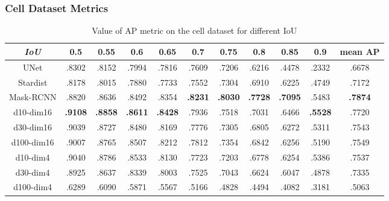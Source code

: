 \documentclass{beamer}
\begin{document}
\begin{frame}
    \frametitle{Cell Dataset Metrics}

    \begin{table}
        \scalebox{0.7}
        {
            \begin{tabular}[pos]{*{11}{c}}
                \hline
                \textit{IoU} & 0.5            & 0.55           & 0.6            & 0.65           & 0.7            & 0.75           & 0.8            & 0.85           & 0.9            & mean AP        \\
                \hline
                UNet         & .8302          & .8152          & .7994          & .7816          & .7609          & .7206          & .6216          & .4478          & .2332          & .6678          \\
                Stardist     & .8178          & .8015          & .7880          & .7733          & .7552          & .7304          & .6910          & .6225          & .4749          & .7172          \\
                Mask-RCNN    & .8820          & .8636          & .8492          & .8354          & \textbf{.8231} & \textbf{.8030} & \textbf{.7728} & \textbf{.7095} & .5483          & \textbf{.7874} \\
                \hline
                d10-dim16    & \textbf{.9108} & \textbf{.8858} & \textbf{.8611} & \textbf{.8428} & .7936          & .7518          & .7031          & .6466          & \textbf{.5528} & .7720          \\
                d30-dim16    & .9039          & .8727          & .8480          & .8169          & .7776          & .7305          & .6805          & .6272          & .5311          & .7543          \\
                d100-dim16   & .9007          & .8765          & .8507          & .8212          & .7812          & .7354          & .6842          & .6256          & .5190          & .7549          \\
                \hline
                d10-dim4     & .9040          & .8786          & .8533          & .8130          & .7723          & .7203          & .6778          & .6254          & .5386          & .7537          \\
                d30-dim4     & .8925          & .8637          & .8339          & .8003          & .7525          & .7043          & .6624          & .6047          & .4878          & .7335          \\
                d100-dim4    & .6289          & .6090          & .5871          & .5567          & .5166          & .4828          & .4494          & .4082          & .3181          & .5063          \\
                \hline
            \end{tabular}
        }
        \caption{Value of AP metric on the cell dataset for different IoU}
    \end{table}


\end{frame}
\end{document}
